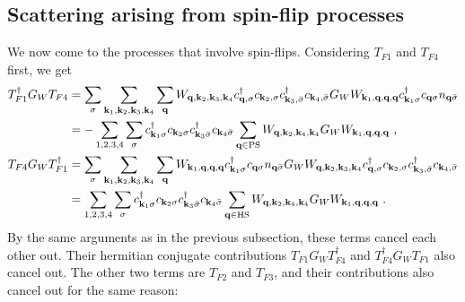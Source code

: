 \documentclass{revtex4-2}
\begin{document}
\subsection{Scattering arising from spin-flip processes}
We now come to the processes that involve spin-flips. Considering \(T_{F1}\) and \(T_{F4}\) first, we get
\begin{equation}\begin{aligned}
	T_{F1}^\dagger G_W T_{F4} &= \sum_\sigma\sum_{{\bf k}_1, {\bf k}_2, {\bf k}_3, {\bf k}_4} \sum_{\bf q} W_{{\bf q},{\bf k}_2,{\bf k}_3,{\bf k}_4}c^\dagger_{{\bf q},\sigma}c_{{\bf k}_2,\sigma}c^\dagger_{{\bf k}_3,\bar\sigma}c_{{\bf k}_4,\bar\sigma} G_W W_{{\bf k}_1, {\bf q}, {\bf q}, {\bf q}}  c^\dagger_{{\bf k}_1\sigma} c_{{\bf q}\sigma} n_{{\bf q} \bar \sigma} \\
							  &= -\sum_{1,2,3,4}\sum_\sigma c^\dagger_{{\bf k}_1\sigma} c_{{\bf k}_2\sigma} c^\dagger_{{\bf k}_3\bar\sigma} c_{{\bf k}_4\bar \sigma} \sum_{\bf q \in \text{PS}} W_{{\bf q}, {\bf k}_2, {\bf k}_4, {\bf k}_4} G_W W_{{\bf k}_1, {\bf q}, {\bf q}, {\bf q}}~,\\
	T_{F4} G_W T_{F1}^\dagger &= \sum_\sigma\sum_{{\bf k}_1, {\bf k}_2, {\bf k}_3, {\bf k}_4} \sum_{\bf q}W_{{\bf k}_1, {\bf q}, {\bf q}, {\bf q}}  c^\dagger_{{\bf k}_1\sigma} c_{{\bf q}\sigma} n_{{\bf q} \bar \sigma} G_W W_{{\bf q},{\bf k}_2,{\bf k}_3,{\bf k}_4}c^\dagger_{{\bf q},\sigma}c_{{\bf k}_2,\sigma}c^\dagger_{{\bf k}_3,\bar\sigma}c_{{\bf k}_4,\bar\sigma}  \\
							  &= \sum_{1,2,3,4}\sum_\sigma c^\dagger_{{\bf k}_1\sigma} c_{{\bf k}_2\sigma} c^\dagger_{{\bf k}_3\bar\sigma} c_{{\bf k}_4\bar \sigma} \sum_{\bf q \in \text{HS}} W_{{\bf q}, {\bf k}_2, {\bf k}_4, {\bf k}_4} G_W W_{{\bf k}_1, {\bf q}, {\bf q}, {\bf q}}~.
\end{aligned}\end{equation}
By the same arguments as in the previous subsection, these terms cancel each other out. Their hermitian conjugate contributions \(T_{F1} G_W T_{F4}^\dagger\) and \(T_{F4}^\dagger G_W T_{F1}\) also cancel out. The other two terms are \(T_{F2}\) and \(T_{F3}\), and their contributions also cancel out for the same reason:
\end{document}
